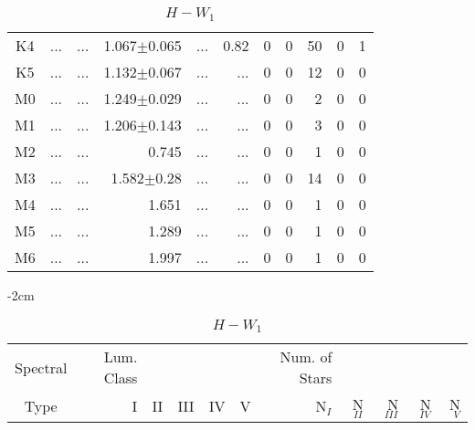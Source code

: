 \begin{table}[t]
\begin{table}[t]
\begin{center}
\begin{tabular}{c|rrrrr|rrrrr}
    K4	&	 ...	&	 ...	&	1.067$\pm$0.065	&	 ...	&	0.82	&	0	&	0	&	50	&	0	&	1	\\
    K5	&	 ...	&	 ...	&	1.132$\pm$0.067	&	 ...	&	 ...	&	0	&	0	&	12	&	0	&	0	\\
    M0	&	 ...	&	 ...	&	1.249$\pm$0.029	&	 ...	&	 ...	&	0	&	0	&	2	&	0	&	0	\\
    M1	&	 ...	&	 ...	&	1.206$\pm$0.143	&	 ...	&	 ...	&	0	&	0	&	3	&	0	&	0	\\
    M2	&	 ...	&	 ...	&	0.745	&	 ...	&	 ...	&	0	&	0	&	1	&	0	&	0	\\
    M3	&	 ...	&	 ...	&	1.582$\pm$0.28	&	 ...	&	 ...	&	0	&	0	&	14	&	0	&	0	\\
    M4	&	 ...	&	 ...	&	1.651	&	 ...	&	 ...	&	0	&	0	&	1	&	0	&	0	\\
    M5	&	 ...	&	 ...	&	1.289	&	 ...	&	 ...	&	0	&	0	&	1	&	0	&	0	\\
    M6	&	 ...	&	 ...	&	1.997	&	 ...	&	 ...	&	0	&	0	&	1	&	0	&	0	\\
        \bottomrule
        \end{tabular}
    \end{center}
    \end{table}
    
    \begin{table}[t]
    \tiny
    \centering
    \caption{$H-W_{1}$}
    \begin{center}
        \addtolength{\leftskip} {-2cm}
        \addtolength{\rightskip}{-2cm}
        \begin{tabular}{c|rrrrr|rrrrr}
        \toprule
        Spectral & Lum. Class & & & & & Num. of Stars & & & &  \\
        Type & I & II & III &  IV & V & N$_{I}$ & N$_{II}$ & N$_{III}$ & N$_{IV}$ & N$_{V}$ \\ \midrule
      

\end{tabular}
\end{center}
\end{table}
\end{table}
